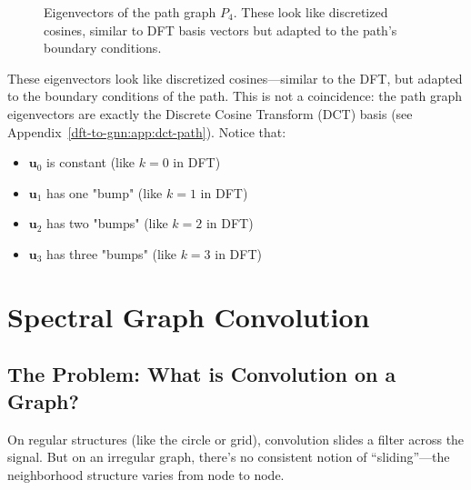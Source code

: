 \begin{notechapter}
\begin{figure}[H]
\caption{Eigenvectors of the path graph $P_4$. These look like discretized
         cosines, similar to DFT basis vectors but adapted to the path's
         boundary conditions.}
\end{figure}

These eigenvectors look like discretized cosines---similar to the DFT, 
but adapted to the boundary conditions of the path. This is not a 
coincidence: the path graph eigenvectors are exactly the Discrete 
Cosine Transform (DCT) basis (see Appendix~\ref{dft-to-gnn:app:dct-path}). Notice that:
\begin{itemize}
    \item $\mathbf{u}_0$ is constant (like $k=0$ in DFT)
    \item $\mathbf{u}_1$ has one "bump" (like $k=1$ in DFT)
    \item $\mathbf{u}_2$ has two "bumps" (like $k=2$ in DFT)
    \item $\mathbf{u}_3$ has three "bumps" (like $k=3$ in DFT) 
\end{itemize}

\section{Spectral Graph Convolution}

\subsection{The Problem: What is Convolution on a Graph?}

On regular structures (like the circle or grid), convolution slides a 
filter across the signal. But on an irregular graph, there's no 
consistent notion of ``sliding''---the neighborhood structure varies 
from node to node.


\end{notechapter}
